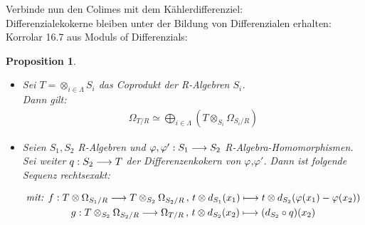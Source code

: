 \documentclass[10pt,a4paper]{report}
\newcommand{\comment}[1]{}
\newcounter{Aussage}[chapter]
\newtheorem{prop}[Aussage]{Proposition}
\newcommand{\functionfront}[3]{\nolinebreak{#1:#2 \longrightarrow #3}}
\newcommand{\function}[5]{\nolinebreak{#1:#2 \longrightarrow #3 \, , \, #4 \longmapsto #5}}
\newcommand{\divR}[2]{\Omega_{#1/#2}}
\newcommand{\Tensor}[3]{#1 \otimes_{#2} #3}
\newcommand{\tensor}[3]{#1 \otimes #3}
\begin{document}
Verbinde nun den Colimes mit dem Kählerdifferenziel:\\
Differenzialekokerne bleiben unter der Bildung von Differenzialen erhalten:
Korrolar 16.7 aus Moduls of Differenzials:
\comment{Beide Beweise sind sehr kurz gefasst}
\begin{prop} \comment{\label{Kählerdifferenzial des Colimes}}
\ \\
\begin{itemize}
\item[\textbf{1.}]
Sei $T = \otimes_{i \in \Lambda} S_i$ das Coprodukt der R-Algebren $S_i$.\\
Dann gilt:
\begin{gather*}
\divR{T}{R} \simeq \bigoplus_{i\in \Lambda} ( \Tensor{T}{S_i}{\divR{S_i}{R}} )
\end{gather*}
\item[\textbf{2.}]
Seien $S_1,S_2$ R-Algebren und $\functionfront{\varphi,\varphi'}{S_1}{S_2}$ R-Algebra-Homomorphismen. Sei weiter $\functionfront{q}{S_2}{T}$ der Differenzenkokern von $\varphi$,$\varphi '$.
Dann ist folgende Sequenz rechtsexakt:\\
\begin{center}
\begin{gather*}
\textit{mit: } \function{f}{\tensor{T}{S_1}{\divR{S_1}{R}}}{\Tensor{T}{S_2}{\divR{S_2}{R}}}{\tensor{t}{S_2}{d_{S_1}(x_1)}}{\tensor{t}{S_2}{d_{S_2}(\varphi(x_1) - \varphi(x_2))}}\\
\function{g}{\Tensor{T}{S_2}{\divR{S_2}{R}}}{\divR{T}{R}}{\tensor{t}{S_2}{d_{S_2}(x_2)}}{(d_{S_2}\circ q)(x_2)}
\end{gather*}
\end{center}
\end{itemize}
\end{prop}
\end{document}
